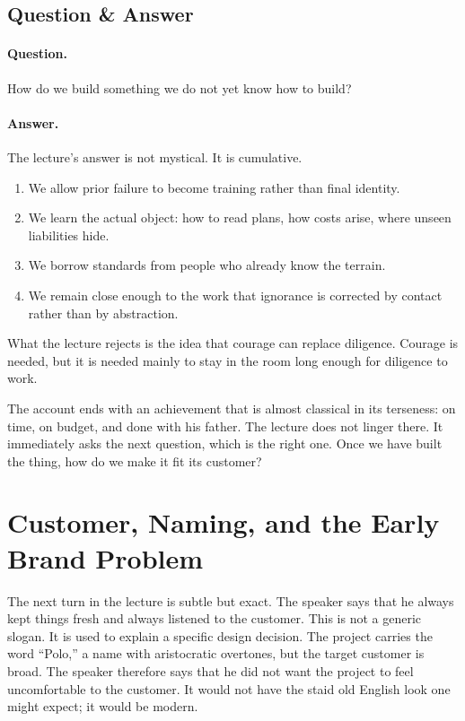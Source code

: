 \subsection{Question \& Answer}

\paragraph{Question.}
How do we build something we do not yet know how to build?

\paragraph{Answer.}
The lecture's answer is not mystical. It is cumulative.
\begin{enumerate}
\item We allow prior failure to become training rather than final identity.
\item We learn the actual object: how to read plans, how costs arise, where unseen liabilities hide.
\item We borrow standards from people who already know the terrain.
\item We remain close enough to the work that ignorance is corrected by contact rather than by abstraction.
\end{enumerate}
What the lecture rejects is the idea that courage can replace diligence. Courage is needed, but it is needed mainly to stay in the room long enough for diligence to work.

The account ends with an achievement that is almost classical in its terseness: on time, on budget, and done with his father. The lecture does not linger there. It immediately asks the next question, which is the right one. Once we have built the thing, how do we make it fit its customer?

\section{Customer, Naming, and the Early Brand Problem}

The next turn in the lecture is subtle but exact. The speaker says that he always kept things fresh and always listened to the customer. This is not a generic slogan. It is used to explain a specific design decision. The project carries the word ``Polo,'' a name with aristocratic overtones, but the target customer is broad. The speaker therefore says that he did not want the project to feel uncomfortable to the customer. It would not have the staid old English look one might expect; it would be modern.

